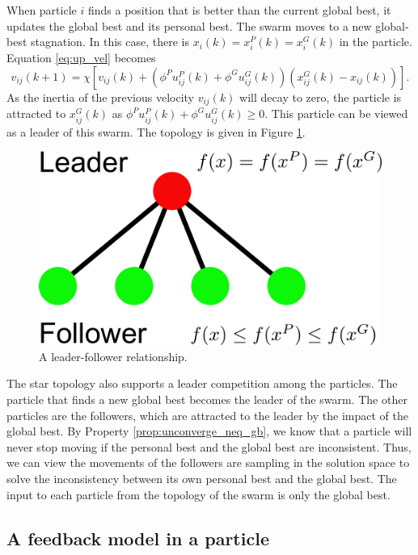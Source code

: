 When particle $ i $ finds a position that is better than the current global best, it updates the global best and its personal best.
The swarm moves to a new global-best stagnation.
In this case, there is $ x_{i}(k) = x_{i}^{P}(k) = x_{i}^{G}(k) $ in the particle.
Equation \eqref{eq:up_vel} becomes
\begin{equation}
v_{ij}(k+1) = \chi [ v_{ij}(k) 
 +( \phi^{P} u^{P}_{ij}(k) + \phi^{G} u^{G}_{ij}(k) ) (x^{G}_{ij}(k) - x_{ij}(k))  ].
\end{equation}
As the inertia of the previous velocity $ v_{ij}(k) $ will decay to zero,
the particle is attracted to $ x^{G}_{ij}(k) $ as $ \phi^{P} u^{P}_{ij}(k) + \phi^{G} u^{G}_{ij}(k) \geq 0 $.
This particle can be viewed as a leader of this swarm.
The topology is given in Figure \ref{fig:leader_follower}.
\begin{figure}[tbph]
\centering
\includegraphics[width=0.5\linewidth]{./fig/leader_follower}
\caption{A leader-follower relationship.}
\label{fig:leader_follower}
\end{figure}

The star topology also supports a leader competition among the particles.
The particle that finds a new global best becomes the leader of the swarm.
The other particles are the followers, which are attracted to the leader by the impact of the global best.
By Property \ref{prop:unconverge_neq_gb}, we know that a particle will never stop moving if the personal best and the global best are inconsistent.
Thus, we can view the movements of the followers are sampling in the solution space to solve the inconsistency between its own personal best and the global best.
The input to each particle from the topology of the swarm is only the global best.

\subsection{A feedback model in a particle}

